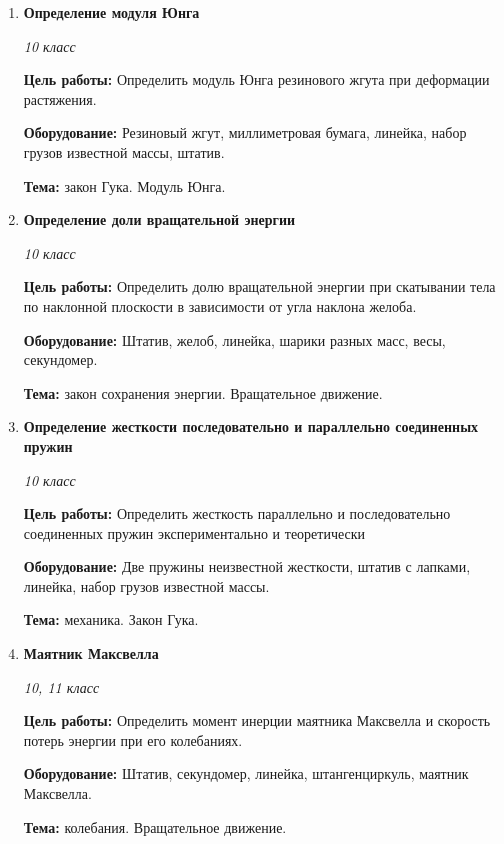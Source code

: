 \documentclass[a4paper,10pt]{article}
\newcommand{\labtitle}[5]{
	\textbf{#2}\par
	\textit{#1 класс}\par
	\textbf{Цель работы:} #3\par
	\textbf{Оборудование:} #4\par
	\textbf{Тема:} #5
}
\begin{document}
\begin{enumerate}
		{10}
		{Определение коэффициента трения}
		{Определить коэффициент трения между деревом и деревом; между деревом и материалом, покрывающим стол.}
		{Штатив, две ученические линейки.}
		{сухое трение.}
	\item \labtitle
		{10}
		{Определение модуля Юнга}
		{Определить модуль Юнга резинового жгута при деформации растяжения.}
		{Резиновый жгут, миллиметровая бумага, линейка, набор грузов известной массы, штатив.}
		{закон Гука. Модуль Юнга.}
	\item \labtitle
		{10}
		{Определение доли вращательной энергии}
		{Определить долю вращательной энергии при скатывании тела по наклонной плоскости в зависимости от угла наклона желоба.}
		{Штатив, желоб, линейка, шарики разных масс, весы, секундомер.}
		{закон сохранения энергии. Вращательное движение.}
	\item \labtitle
		{10}
		{Определение жесткости последовательно и параллельно соединенных пружин}
		{Определить жесткость параллельно и последовательно соединенных пружин экспериментально и теоретически}
		{Две пружины неизвестной жесткости, штатив с лапками, линейка, набор грузов известной массы.}
		{механика. Закон Гука.}
	\item \labtitle
		{10, 11}
		{Маятник Максвелла}
		{Определить момент инерции маятника Максвелла и скорость потерь энергии при его колебаниях.}
		{Штатив, секундомер, линейка, штангенциркуль, маятник Максвелла.}
		{колебания. Вращательное движение.}


\end{enumerate}
\end{document}
